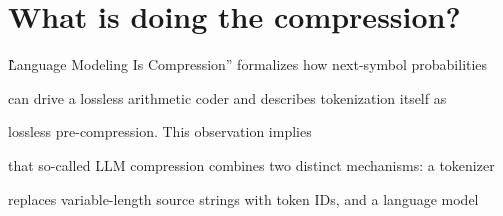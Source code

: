 \documentclass{article}
\begin{document}




%





%










\section{What is doing the compression?}

\`\`Language Modeling Is Compression'' formalizes how next-symbol probabilities

can drive a lossless arithmetic coder and describes tokenization itself as

lossless pre-compression\~\citep{deletang2024language}. This observation implies

that so-called LLM compression combines two distinct mechanisms: a tokenizer

replaces variable-length source strings with token IDs, and a language model
\end{document}

